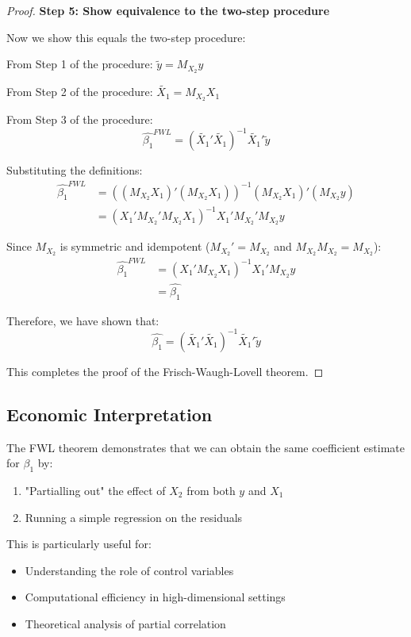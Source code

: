 \documentclass{article}
\newtheorem{proof}{Proof}
\begin{document}
\begin{proof}
\textbf{Step 5: Show equivalence to the two-step procedure}

Now we show this equals the two-step procedure:

From Step 1 of the procedure: $\tilde{y} = M_{X_2}y$

From Step 2 of the procedure: $\tilde{X_1} = M_{X_2}X_1$

From Step 3 of the procedure:
\begin{equation}
\hat{\beta_1}^{FWL} = (\tilde{X_1}'\tilde{X_1})^{-1}\tilde{X_1}'\tilde{y}
\end{equation}

Substituting the definitions:
\begin{align}
\hat{\beta_1}^{FWL} &= ((M_{X_2}X_1)'(M_{X_2}X_1))^{-1}(M_{X_2}X_1)'(M_{X_2}y) \\
&= (X_1'M_{X_2}'M_{X_2}X_1)^{-1}X_1'M_{X_2}'M_{X_2}y
\end{align}

Since $M_{X_2}$ is symmetric and idempotent ($M_{X_2}' = M_{X_2}$ and $M_{X_2}M_{X_2} = M_{X_2}$):
\begin{align}
\hat{\beta_1}^{FWL} &= (X_1'M_{X_2}X_1)^{-1}X_1'M_{X_2}y \\
&= \hat{\beta_1}
\end{align}

Therefore, we have shown that:
\begin{equation}
\hat{\beta_1} = (\tilde{X_1}'\tilde{X_1})^{-1}\tilde{X_1}'\tilde{y}
\end{equation}

This completes the proof of the Frisch-Waugh-Lovell theorem.
\end{proof}

\subsection{Economic Interpretation}

The FWL theorem demonstrates that we can obtain the same coefficient estimate for $\beta_1$ by:
\begin{enumerate}
    \item "Partialling out" the effect of $X_2$ from both $y$ and $X_1$
    \item Running a simple regression on the residuals
\end{enumerate}

This is particularly useful for:
\begin{itemize}
    \item Understanding the role of control variables
    \item Computational efficiency in high-dimensional settings
    \item Theoretical analysis of partial correlation
\end{itemize}
\end{document}
